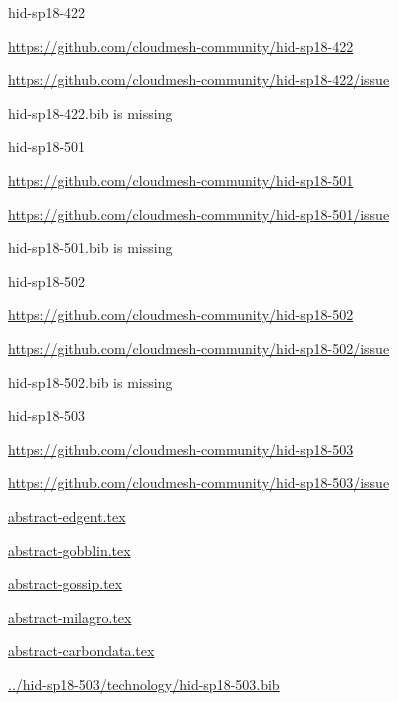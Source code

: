 \begin{IU}

hid-sp18-422

\url{https://github.com/cloudmesh-community/hid-sp18-422}

\url{https://github.com/cloudmesh-community/hid-sp18-422/issue}

hid-sp18-422.bib is missing

\end{IU}


\begin{IU}

hid-sp18-501

\url{https://github.com/cloudmesh-community/hid-sp18-501}

\url{https://github.com/cloudmesh-community/hid-sp18-501/issue}

hid-sp18-501.bib is missing

\end{IU}


\begin{IU}

hid-sp18-502

\url{https://github.com/cloudmesh-community/hid-sp18-502}

\url{https://github.com/cloudmesh-community/hid-sp18-502/issue}

hid-sp18-502.bib is missing

\end{IU}


\begin{IU}

hid-sp18-503

\url{https://github.com/cloudmesh-community/hid-sp18-503}

\url{https://github.com/cloudmesh-community/hid-sp18-503/issue}

\href{https://github.com/cloudmesh-community/hid-sp18-503/blob/master//technology/abstract-edgent.tex}{abstract-edgent.tex}

\href{https://github.com/cloudmesh-community/hid-sp18-503/blob/master//technology/abstract-gobblin.tex}{abstract-gobblin.tex}

\href{https://github.com/cloudmesh-community/hid-sp18-503/blob/master//technology/abstract-gossip.tex}{abstract-gossip.tex}

\href{https://github.com/cloudmesh-community/hid-sp18-503/blob/master//technology/abstract-milagro.tex}{abstract-milagro.tex}

\href{https://github.com/cloudmesh-community/hid-sp18-503/blob/master//technology/abstract-carbondata.tex}{abstract-carbondata.tex}

\href{https://github.com/cloudmesh-community/hid-sp18-503/blob/master//technology/hid-sp18-503.bib}{../hid-sp18-503/technology/hid-sp18-503.bib}

\end{IU}


